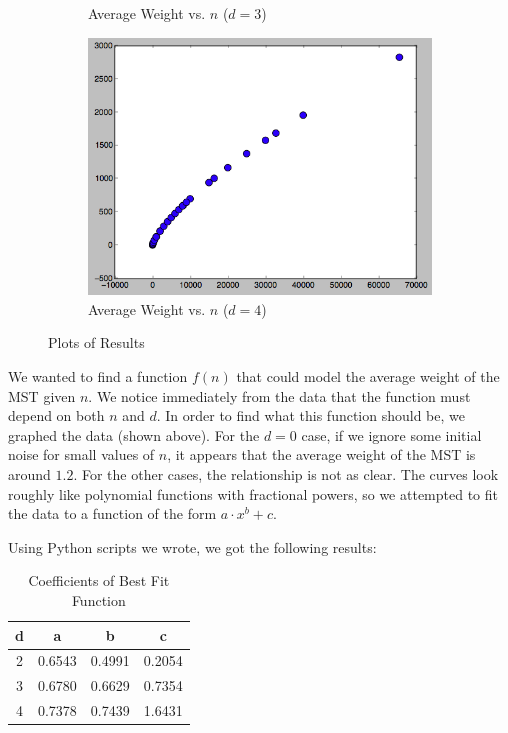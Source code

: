 \documentclass[12pt]{article}
\begin{document}
\begin{figure}
\begin{subfigure}{.5\textwidth}
  \caption{Average Weight vs. $n$ ($d = 3$)}
  \label{fig:sub3}
\end{subfigure}%
\begin{subfigure}{.5\textwidth}
  \centering
  \includegraphics[width=0.8\linewidth]{img/result4.png}
  \caption{Average Weight vs. $n$ ($d = 4$)}
  \label{fig:sub4}
\end{subfigure}%
\caption{Plots of Results}
\end{figure}

We wanted to find a function $f(n)$ that could model the average weight of the MST given $n$. We notice immediately from the data that the function must depend on both $n$ and $d$. In order to find what this function should be, we graphed the data (shown above). For the $d = 0$ case, if we ignore some initial noise for small values of $n$, it appears that the average weight of the MST is around $1.2$. For the other cases, the relationship is not as clear. The curves look roughly like polynomial functions with fractional powers, so we attempted to fit the data to a function of the form $a \cdot x ^ b + c$. 

Using Python scripts we wrote, we got the following results: \\

\begin{table}[h!]
\centering
\caption{Coefficients of Best Fit Function}
\renewcommand{\arraystretch}{1.2}
{\setlength{\tabcolsep}{15pt}
\begin{tabular} {c | c | c | c }
d&a&b&c\\ \hline
2&0.6543&0.4991&0.2054\\
3&0.6780&0.6629&0.7354\\
4&0.7378&0.7439&1.6431\\
\end{tabular}}
\label{table:3}
\end{table}
\end{document}
